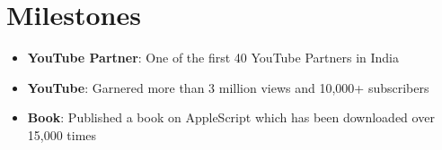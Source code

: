 \documentclass[a4paper,12pt]{article} %
\newcommand{\generalListStart}{\begin{itemize}[leftmargin=2em]\setlength\itemsep{0.02em}}
\newcommand{\generalListEnd}{\end{itemize}}
\newcommand{\oneKeyValuePairElement}[2]{
	\item \textbf{#1}{: #2}
}
\begin{document}

\vspace{0.5em}\section*{Milestones}

\generalListStart
	\oneKeyValuePairElement{YouTube Partner}{One of the first 40 YouTube Partners in India}
	\oneKeyValuePairElement{YouTube}{Garnered more than 3 million views and 10,000+ subscribers}
	\oneKeyValuePairElement{Book}{Published a book on AppleScript which has been downloaded over 15,000 times}
\generalListEnd
\end{document}
